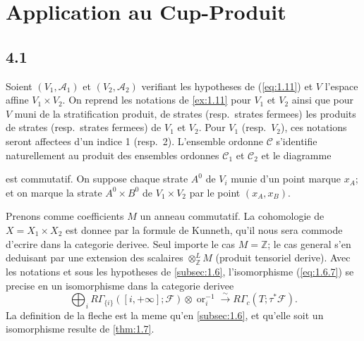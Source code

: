 \documentclass[11pt,a4paper]{article}
\theoremstyle{plain}
\theoremstyle{definition}
\newcommand{\ori}{\operatorname{or}}
\begin{document}
\section{Application au Cup-Produit}\label{sec:4}

\subsection{4.1}\label{subsec:4.1}

Soient $(V_1,\mathcal{A}_1)$ et $(V_2,\mathcal{A}_2)$ verifiant les hypotheses de (\ref{eq:1.11}) et $V$ l'espace affine $V_1 \times V_2$. On reprend les notations de \ref{ex:1.11} pour $V_1$ et $V_2$ ainsi que pour $V$ muni de la stratification produit, de strates (resp.~strates fermees) les produits de strates (resp.~strates fermees) de $V_1$ et $V_2$. Pour $V_1$ (resp.~$V_2$), ces notations seront affectees d'un indice 1 (resp.~2). L'ensemble ordonne $\mathcal{C}$ s'identifie naturellement au produit des ensembles ordonnes $\mathcal{C}_1$ et $\mathcal{C}_2$ et le diagramme
est commutatif. On suppose chaque strate $A^0$ de $V_i$ munie d'un point marque $x_A$; et on marque la strate $A^0 \times B^0$ de $V_1 \times V_2$ par le point $(x_A, x_B)$.

Prenons comme coefficients $M$ un anneau commutatif. La cohomologie de $X = X_1 \times X_2$ est donnee par la formule de Kunneth, qu'il nous sera commode d'ecrire dans la categorie derivee. Seul importe le cas $M = \mathbb{Z}$; le cas general s'en deduisant par une extension des scalaires $\otimes^L_{\mathbb{Z}} M$ (produit tensoriel derive). Avec les notations et sous les hypotheses de \ref{subsec:1.6}, l'isomorphisme (\ref{eq:1.6.7}) se precise en un isomorphisme dans la categorie derivee
\begin{equation}\label{eq:4.1.1}
\bigoplus_i R\Gamma_{\{i\}}([i,+\infty];\mathcal{F}) \otimes \ori_i^{-1} \xrightarrow{\sim} R\Gamma_c(T;\tau^*\mathcal{F}).
\tag{4.1.1}
\end{equation}
La definition de la fleche est la meme qu'en \ref{subsec:1.6}, et qu'elle soit un isomorphisme resulte de \ref{thm:1.7}.
\end{document}
